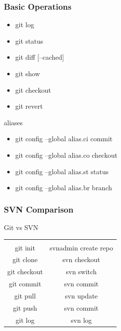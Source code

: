 \documentclass[10pt]{beamer}
\begin{document}
\begin{frame}
    \frametitle{Basic Operations}
    \begin{itemize}
        \item git log
        \item git status
        \item git diff [--cached]
        \item git show
        \item git checkout
        \item git revert
    \end{itemize}
    \begin{block}{aliases}
        \begin{itemize}
            \item git config --global alias.ci commit
            \item git config --global alias.co checkout
            \item git config --global alias.st status
            \item git config --global alias.br branch
        \end{itemize}
    \end{block}
\end{frame}

\begin{frame}
    \frametitle{SVN Comparison}
    \begin{block}{Git vs SVN}
        \begin{table}[h]
            \centering
            \begin{tabular}{|c|c|}
                \hline
                & \\ [-1ex]
                git init & svnadmin create repo \\[.25ex]
                \hline
                git clone & svn checkout \\[.25ex]
                \hline
                git checkout & svn switch \\[.25ex]
                \hline
                git commit  & svn commit \\[.25ex]
                \hline
                git pull  & svn update \\[.25ex]
                \hline
                git push  & svn commit \\[.25ex]
                \hline
                git log  & svn log \\[.25ex]
                \hline
            \end{tabular}
        \end{table}
    \end{block}
\end{frame}
\end{document}
